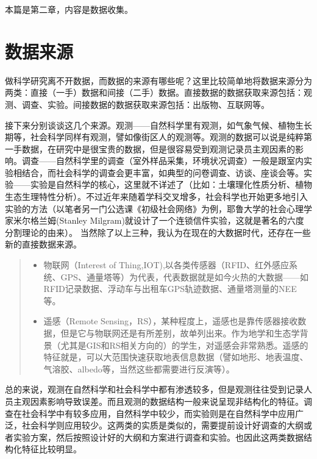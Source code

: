 \documentclass[]{ctexbook}
\providecommand{\tightlist}{%
  \setlength{\itemsep}{0pt}\setlength{\parskip}{0pt}}
\begin{document}
本篇是第二章，内容是数据收集。

\hypertarget{ux6570ux636eux6765ux6e90}{%
\section{数据来源}\label{ux6570ux636eux6765ux6e90}}

做科学研究离不开数据，而数据的来源有哪些呢？这里比较简单地将数据来源分为两类：直接（一手）数据和间接（二手）数据。直接数据的数据获取来源包括：观测、调查、实验。间接数据的数据获取来源包括：出版物、互联网等。

接下来分别谈谈这几个来源。观测------自然科学里有观测，如气象气候、植物生长期等，社会科学同样有观测，譬如像街区人的观测等。观测的数据可以说是纯粹第一手数据，在研究中是很宝贵的数据，但是很容易受到观测记录员主观因素的影响。调查------自然科学里的调查（室外样品采集，环境状况调查）一般是跟室内实验相结合，而社会科学的调查会更丰富，如典型的问卷调查、访谈、座谈会等。实验------实验是自然科学的核心，这里就不详述了（比如：土壤理化性质分析、植物生态生理特性分析）。不过近年来随着学科交叉增多，社会科学也开始更多地引入实验的方法（以笔者另一门公选课《初级社会网络》为例，耶鲁大学的社会心理学家米尔格兰姆(Stanley Milgram)就设计了一个连锁信件实验，这就是著名的六度分割理论的由来）。
当然除了以上三种，我认为在现在的大数据时代，还存在一些新的直接数据来源。

\begin{quote}
\begin{itemize}
\tightlist
\item
  物联网（Interest of Thing,IOT),以各类传感器（RFID、红外感应系统、GPS、通量塔等）为代表，代表数据就是如今火热的大数据------如RFID记录数据、浮动车与出租车GPS轨迹数据、通量塔测量的NEE等。
\item
  遥感（Remote Sensing，RS），某种程度上，遥感也是靠传感器接收数据，但是它与物联网还是有所差别，故单列出来。作为地学和生态学背景（尤其是GIS和RS相关方向的）的学生，对遥感会非常熟悉。遥感的特征就是，可以大范围快速获取地表信息数据（譬如地形、地表温度、气溶胶、albedo等，当然这些都需要进行反演等）。
\end{itemize}
\end{quote}

总的来说，观测在自然科学和社会科学中都有渗透较多，但是观测往往受到记录人员主观因素影响导致误差。而且观测的数据结构一般来说呈现非结构化的特征。调查在社会科学中有较多应用，自然科学中较少，而实验则是在自然科学中应用广泛，社会科学则应用较少。这两类的实质是类似的，需要提前设计好调查的大纲或者实验方案，然后按照设计好的大纲和方案进行调查和实验。也因此这两类数据结构化特征比较明显。
\end{document}
